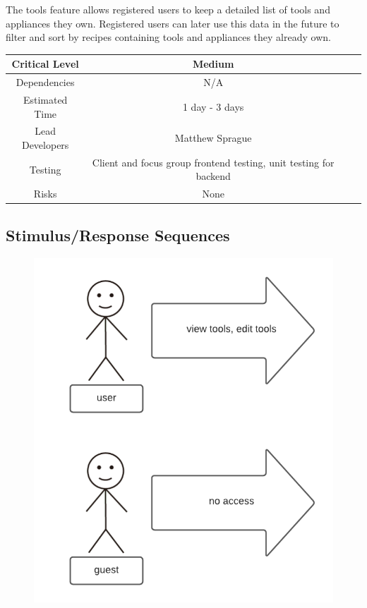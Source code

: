 \documentclass{scrreprt}
\begin{document}
The tools feature allows registered users to keep a detailed list of tools and appliances they own. Registered users can later use this data in the future to filter and sort by recipes containing tools and appliances they already own.

\begin{center}
    \begin{tabular}{| c | c | c | c |}
        \hline
        Critical Level  & Medium                                                            \\
        \hline
        Dependencies    & N/A                                                               \\
        \hline
        Estimated Time  & 1 day - 3 days                                                    \\
        \hline
        Lead Developers & Matthew Sprague                                 \\
        \hline
        Testing         & Client and focus group \gls{frontend} testing,
                          \gls{unit testing} for \gls{backend}                              \\
        \hline
        Risks           & None                                                              \\
        \hline
    \end{tabular}
\end{center}

\subsection{Stimulus/Response Sequences}

\begin{figure}[H]\centering
    \includegraphics[width=\columnwidth]{response diagrams/Tools.png}
\end{figure}
\end{document}
